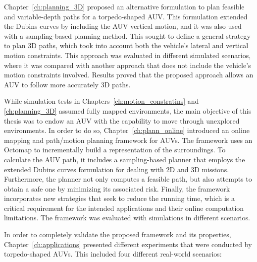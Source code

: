 Chapter~\ref{ch:planning_3D} proposed an alternative formulation to plan
feasible and variable-depth paths for a torpedo-shaped \ac{AUV}. This
formulation extended the Dubins curves by including the \ac{AUV} vertical
motion, and it was also used with a sampling-based planning method. This sought
to define a general strategy to plan \ac{3D} paths, which took into account both
the vehicle's lateral and vertical motion constraints. This approach was
evaluated in different simulated scenarios, where it was compared with another
approach that does not include the vehicle's motion constraints involved.
Results proved that the proposed approach allows an \ac{AUV} to follow more
accurately \ac{3D} paths.

While simulation tests in Chapters~\ref{ch:motion_constratins} and
\ref{ch:planning_3D} assumed fully mapped environments, the main objective of
this thesis was to endow an \ac{AUV} with the capability to move through
unexplored environments. In order to do so, Chapter~\ref{ch:plann_online}
introduced an online mapping and path/motion planning framework for \acp{AUV}.
The framework uses an Octomap to incrementally build a representation of the
surroundings. To calculate the \ac{AUV} path, it includes a sampling-based
planner that employs the extended Dubins curves formulation for dealing with
\ac{2D} and \ac{3D} missions. Furthermore, the planner not only computes a
feasible path, but also attempts to obtain a safe one by minimizing its
associated risk. Finally, the framework incorporates new strategies that seek to
reduce the running time, which is a critical requirement for the intended
applications and their online computation limitations. The framework was
evaluated with simulations in different scenarios.

In order to completely validate the proposed framework and its properties,
Chapter~\ref{ch:applications} presented different experiments that were
conducted by torpedo-shaped \acp{AUV}. This included four different real-world
scenarios:


